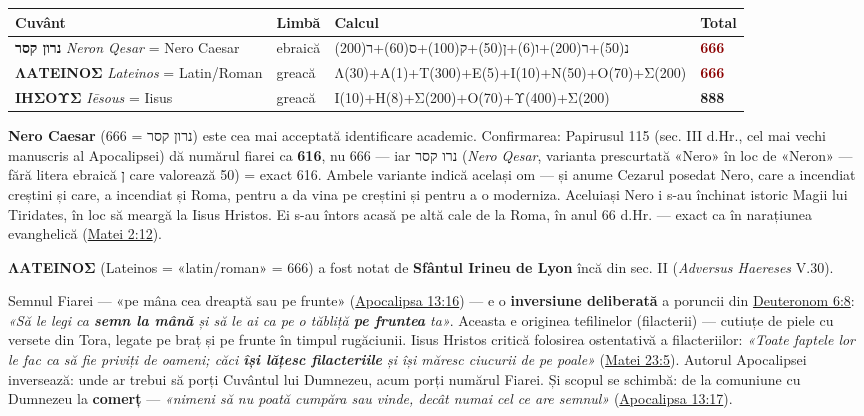 \documentclass[12pt,a4paper,twoside,openany]{book}
\begin{document}
\begin{center}
\small
\begin{tabular}{L{5.2cm}L{1.1cm}L{7.6cm}L{0.8cm}}
\toprule
{}
\textbf{Cuvânt} & \textbf{Limbă} & \textbf{Calcul} & \textbf{Total} \\
\midrule
\textbf{נרון קסר} \newline  \textit{Neron Qesar} = Nero Caesar & ebraică & נ(50)+ר(200)+ו(6)+ן(50)+ק(100)+ס(60)+ר(200) & \textcolor{darkred}{\textbf{666}} \\
\textbf{ΛΑΤΕΙΝΟΣ} \newline  \textit{Lateinos} = Latin/Roman & greacă & Λ(30)+Α(1)+Τ(300)+Ε(5)+Ι(10)+Ν(50)+Ο(70)+Σ(200) & \textcolor{darkred}{\textbf{666}} \\
\textbf{ΙΗΣΟΥΣ} \newline  \textit{Iēsous} = Iisus & greacă & Ι(10)+Η(8)+Σ(200)+Ο(70)+Υ(400)+Σ(200) & \textbf{888} \\
\bottomrule
\end{tabular}
\end{center}
\normalsize
\textbf{Nero Caesar} (נרון קסר = 666) este cea mai acceptată identificare academic. Confirmarea: Papirusul 115 (sec. III d.Hr., cel mai vechi manuscris al Apocalipsei) dă numărul fiarei ca \textbf{616}, nu 666 — iar נרו קסר (\textit{Nero Qesar}, varianta prescurtată «Nero» în loc de «Neron» — fără litera ebraică ן care valorează 50) = exact 616. Ambele variante indică același om — și anume Cezarul posedat Nero, care a incendiat creștini și care, a incendiat și Roma, pentru a da vina pe creștini și pentru a o moderniza. Aceluiași Nero i s-au închinat istoric Magii lui Tiridates, în loc să meargă la Iisus Hristos. Ei s-au întors acasă pe altă cale de la Roma, în anul 66 d.Hr. — exact ca în narațiunea evanghelică (\href{https://bibliaortodoxa.ro/carte.php?id=55\&cap=2\#12}{Matei 2:12}).

\textbf{ΛΑΤΕΙΝΟΣ} (Lateinos = «latin/roman» = 666) a fost notat de \textbf{Sfântul Irineu de Lyon} încă din sec. II (\textit{Adversus Haereses} V.30).

Semnul Fiarei — «pe mâna cea dreaptă sau pe frunte» (\href{https://bibliaortodoxa.ro/carte.php?id=4\&cap=13\#16}{Apocalipsa 13:16}) — e o \textbf{inversiune deliberată} a poruncii din \href{https://bibliaortodoxa.ro/carte.php?id=17\&cap=6\#8}{Deuteronom 6:8}: \textit{«Să le legi ca \textbf{semn la mână} și să le ai ca pe o tăbliță \textbf{pe fruntea} ta»}. Aceasta e originea tefilinelor (filacterii) — cutiuțe de piele cu versete din Tora, legate pe braț și pe frunte în timpul rugăciunii. Iisus Hristos critică folosirea ostentativă a filacteriilor: \textit{«Toate faptele lor le fac ca să fie priviți de oameni; căci \textbf{își lățesc filacteriile} și își măresc ciucurii de pe poale»} (\href{https://bibliaortodoxa.ro/carte.php?id=55\&cap=23\#5}{Matei 23:5}). Autorul Apocalipsei inversează: unde ar trebui să porți Cuvântul lui Dumnezeu, acum porți numărul Fiarei. Și scopul se schimbă: de la comuniune cu Dumnezeu la \textbf{comerț} — \textit{«nimeni să nu poată cumpăra sau vinde, decât numai cel ce are semnul»} (\href{https://bibliaortodoxa.ro/carte.php?id=4\&cap=13\#17}{Apocalipsa 13:17}).
\end{document}
